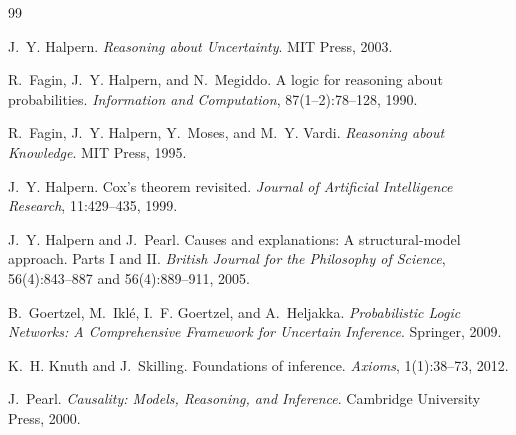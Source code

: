 \documentclass[11pt]{article}
\begin{document}
\begin{thebibliography}{99}

J.~Y. Halpern.
\newblock \emph{Reasoning about Uncertainty}.
\newblock MIT Press, 2003.

R.~Fagin, J.~Y. Halpern, and N.~Megiddo.
\newblock A logic for reasoning about probabilities.
\newblock \emph{Information and Computation}, 87(1--2):78--128, 1990.

R.~Fagin, J.~Y. Halpern, Y.~Moses, and M.~Y. Vardi.
\newblock \emph{Reasoning about Knowledge}.
\newblock MIT Press, 1995.

J.~Y. Halpern.
\newblock Cox's theorem revisited.
\newblock \emph{Journal of Artificial Intelligence Research}, 11:429--435, 1999.

J.~Y. Halpern and J.~Pearl.
\newblock Causes and explanations: A structural-model approach. Parts I and II.
\newblock \emph{British Journal for the Philosophy of Science}, 56(4):843--887 and 56(4):889--911, 2005.

B.~Goertzel, M.~Ikl\'{e}, I.~F. Goertzel, and A.~Heljakka.
\newblock \emph{Probabilistic Logic Networks: A Comprehensive Framework for Uncertain Inference}.
\newblock Springer, 2009.

K.~H. Knuth and J.~Skilling.
\newblock Foundations of inference.
\newblock \emph{Axioms}, 1(1):38--73, 2012.

J.~Pearl.
\newblock \emph{Causality: Models, Reasoning, and Inference}.
\newblock Cambridge University Press, 2000.

\end{thebibliography}
\end{document}
